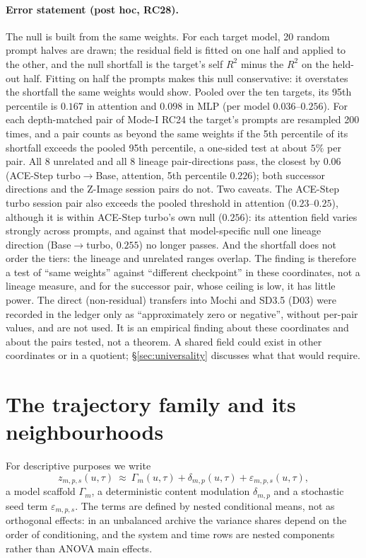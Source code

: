 \documentclass[11pt]{article}
\theoremstyle{definition}
\begin{document}
\paragraph{Error statement (post hoc, RC28).} The null is built from the same weights. For each target model, 20 random prompt halves are drawn; the residual field is fitted on one half and applied to the other, and the null shortfall is the target's self $R^2$ minus the $R^2$ on the held-out half. Fitting on half the prompts makes this null conservative: it overstates the shortfall the same weights would show. Pooled over the ten targets, its 95th percentile is $0.167$ in attention and $0.098$ in MLP (per model $0.036$--$0.256$). For each depth-matched pair of Mode-I RC24 the target's prompts are resampled 200 times, and a pair counts as beyond the same weights if the 5th percentile of its shortfall exceeds the pooled 95th percentile, a one-sided test at about $5\%$ per pair. All 8 unrelated and all 8 lineage pair-directions pass, the closest by $0.06$ (ACE-Step turbo$\to$Base, attention, 5th percentile $0.226$); both successor directions and the Z-Image session pairs do not. Two caveats. The ACE-Step turbo session pair also exceeds the pooled threshold in attention ($0.23$--$0.25$), although it is within ACE-Step turbo's own null ($0.256$): its attention field varies strongly across prompts, and against that model-specific null one lineage direction (Base$\to$turbo, $0.255$) no longer passes. And the shortfall does not order the tiers: the lineage and unrelated ranges overlap. The finding is therefore a test of ``same weights'' against ``different checkpoint'' in these coordinates, not a lineage measure, and for the successor pair, whose ceiling is low, it has little power. The direct (non-residual) transfers into Mochi and SD3.5 (D03) were recorded in the ledger only as ``approximately zero or negative'', without per-pair values, and are not used. It is an empirical finding about these coordinates and about the pairs tested, not a theorem. A shared field could exist in other coordinates or in a quotient; \S\ref{sec:universality} discusses what that would require.


\section{The trajectory family and its neighbourhoods}\label{sec:family}

For descriptive purposes we write
\begin{equation}\label{eq:gamma}
 z_{m,p,s}(u,\tau)\ \approx\ \Gamma_m(u,\tau)+\delta_{m,p}(u,\tau)+\varepsilon_{m,p,s}(u,\tau),
\end{equation}
a model scaffold $\Gamma_m$, a deterministic content modulation $\delta_{m,p}$ and a stochastic seed term $\varepsilon_{m,p,s}$. The terms are defined by nested conditional means, not as orthogonal effects: in an unbalanced archive the variance shares depend on the order of conditioning, and the system and time rows are nested components rather than ANOVA main effects.
\end{document}

